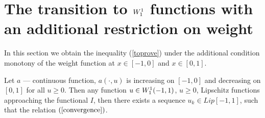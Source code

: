 \section{The transition to $W_1^1$ functions with an additional restriction on weight}
\label{ASC}

In this section we obtain the inequality (\ref{toprove}) under the additional condition
monotony of the weight function at $x \in [-1, 0]$ and $x \in [0, 1]$.

\begin{lm}
\label{Wapprox}
Let $a$ --- continuous function, $a(\cdot, u)$ is increasing on $[-1, 0]$ and decreasing on $[0, 1]$ for all $u \ge 0$.
Then any function $u \in W_1^1(-1, 1)$, $u \ge 0$,
Lipschitz functions approaching the functional $I$,
then there exists a sequence $u_k \in Lip[-1, 1]$, such that the relation $(\ref{convergence})$.
\end{lm}

